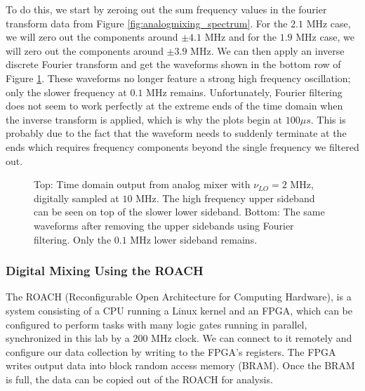 \documentclass[12pt]{article}
\begin{document}
To do this, we start by zeroing out the sum frequency values in the fourier transform data from Figure \ref{fig:analogmixing_spectrum}. For the $2.1$ MHz case, we will zero out the components around $\pm4.1$ MHz and for the $1.9$ MHz case, we will zero out the components around $\pm3.9$ MHz. We can then apply an inverse discrete Fourier transform and get the waveforms shown in the bottom row of Figure \ref{fig:analogmixing_signal}. These waveforms no longer feature a strong high frequency oscillation; only the slower frequency at $0.1$ MHz remains. Unfortunately, Fourier filtering does not seem to work perfectly at the extreme ends of the time domain when the inverse transform is applied, which is why the plots begin at $100 \mu s$. This is probably due to the fact that the waveform needs to suddenly terminate at the ends which requires frequency components beyond the single frequency we filtered out.

\begin{figure}[H]
\caption[SODUMB]{Top: Time domain output from analog mixer with $\nu_{LO}=2$ MHz, digitally sampled at $10$ MHz. The high frequency upper sideband can be seen on top of the slower lower sideband. Bottom: The same waveforms after removing the upper sidebands using Fourier filtering. Only the $0.1$ MHz lower sideband remains.}
\label{fig:analogmixing_signal}
\end{figure}


\subsubsection{Digital Mixing Using the ROACH}
The ROACH (Reconfigurable Open Architecture for Computing Hardware), is a system consisting of a CPU running a Linux kernel and an FPGA, which can be configured to perform tasks with many logic gates running in parallel, synchronized in this lab by a $200$ MHz clock. We can connect to it remotely and configure our data collection by writing to the FPGA's registers. The FPGA writes output data into block random access memory (BRAM). Once the BRAM is full, the data can be copied out of the ROACH for analysis.
\end{document}
